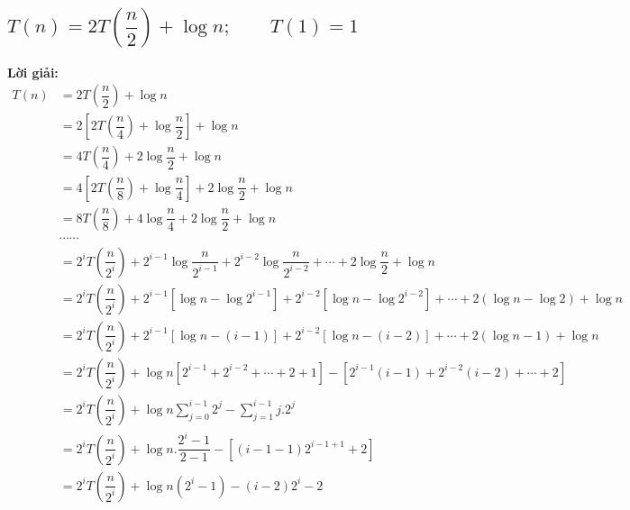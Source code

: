 \documentclass[12pt, letterpaper]{article}
\begin{document}
\subsection{$T(n) = 2T(\dfrac{n}{2}) + \log n; \quad \quad T(1) = 1$}
\textbf{Lời giải:} \\
$ \begin{aligned}
		T(n) & = 2T(\dfrac{n}{2}) + \log n                                                                                                     \\
		     & = 2[2T(\dfrac{n}{4}) + \log \dfrac{n}{2}] + \log n                                                                              \\
		     & = 4T(\dfrac{n}{4}) + 2\log \dfrac{n}{2} + \log n                                                                                \\
		     & = 4[2T(\dfrac{n}{8}) + \log \dfrac{n}{4}] + 2\log \dfrac{n}{2} + \log n                                                         \\
		     & = 8T(\dfrac{n}{8}) + 4\log \dfrac{n}{4} + 2\log \dfrac{n}{2} + \log n                                                           \\
		     & \cdots \cdots                                                                                                                   \\
		     & = 2^iT(\dfrac{n}{2^i}) + 2^{i-1}\log \dfrac{n}{2^{i-1}} + 2^{i-2}\log \dfrac{n}{2^{i-2}} + \cdots + 2\log \dfrac{n}{2} + \log n \\
		     & = 2^iT(\dfrac{n}{2^i}) + 2^{i-1}[\log n - \log 2^{i-1}] + 2^{i-2}[\log n - \log 2^{i-2}] + \cdots + 2(\log n - \log 2) + \log n \\
		     & = 2^iT(\dfrac{n}{2^i}) + 2^{i-1}[\log n - (i-1)] + 2^{i-2}[\log n - (i-2)] + \cdots + 2(\log n - 1) + \log n                    \\
		     & = 2^iT(\dfrac{n}{2^i}) + \log n[2^{i-1} + 2^{i-2} + \cdots + 2 + 1] - [2^{i-1}(i-1) + 2^{i-2}(i-2) + \cdots + 2]                \\
		     & = 2^iT(\dfrac{n}{2^i}) + \log n \sum_{j=0}^{i-1} 2^j - \sum_{j=1}^{i-1} j.2^j                                                   \\
		     & = 2^iT(\dfrac{n}{2^i}) + \log n. \dfrac{2^i - 1}{2 - 1} - [(i - 1 - 1)2^{i - 1 + 1} + 2]                                        \\
		     & = 2^iT(\dfrac{n}{2^i}) + \log n(2^i - 1) - (i-2)2^i - 2                                                                         \\
	\end{aligned} $ \\ \\ \\
\end{document}
